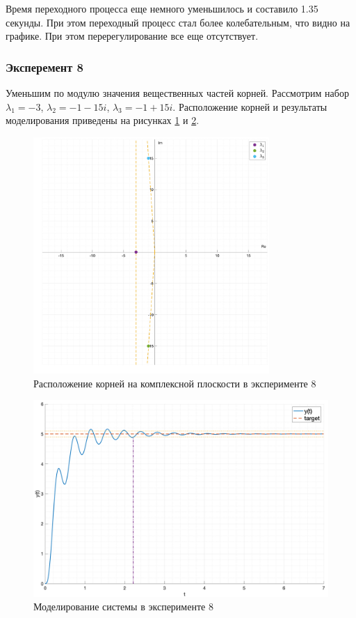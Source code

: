 Время переходного процесса еще немного уменьшилось и составило 1.35 секунды. При этом 
переходный процесс стал более колебательным, что видно на графике. При этом перерегулирование 
все еще отсутствует.

\subsubsection{Эксперемент 8}
\label{task2_case8}
Уменьшим по модулю значения вещественных частей корней. Рассмотрим набор 
$\lambda_1 = -3$, $\lambda_2 = -1 - 15i$, $\lambda_3 = -1 + 15i$.
Расположение корней и результаты моделирования приведены на рисунках
\ref{fig:task_2_points8} и \ref{fig:task_2_case8}.

\begin{figure}
    \centering
    \includegraphics[width=0.8\textwidth]{media/plots/task2_points8.png}
    \caption{Расположение корней на комплексной плоскости в эксперименте 8}
    \label{fig:task_2_points8}
\end{figure}

\begin{figure}
    \centering
    \includegraphics[width=\textwidth]{media/plots/task2_case8.png}
    \caption{Моделирование системы в эксперименте 8}
    \label{fig:task_2_case8}
\end{figure}

